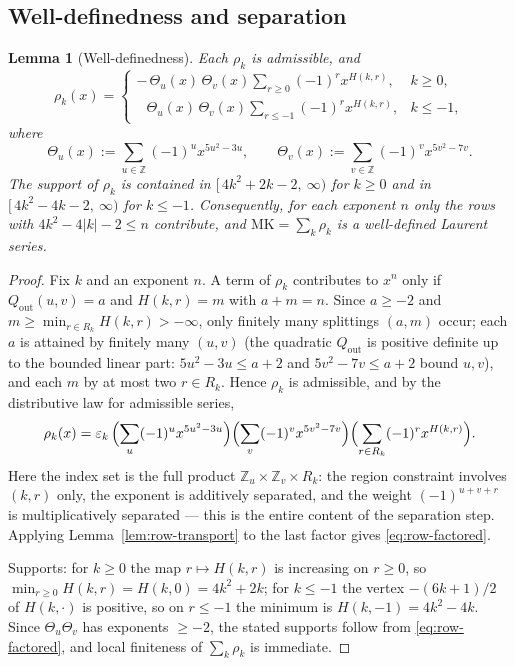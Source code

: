 \documentclass[12pt]{amsart}
\newtheorem{lemma}[theorem]{Lemma}
\theoremstyle{definition}
\theoremstyle{remark}
\newcommand{\ZZ}{\mathbb{Z}}
\newcommand{\MK}{\mathrm{MK}}
\begin{document}
\subsection{Well-definedness and separation}

\begin{lemma}[Well-definedness]\label{lem:mk-welldef}
Each $\rho_k$ is admissible, and
\begin{equation}\label{eq:row-factored}
  \rho_k(x)=
  \begin{cases}
    -\,\Theta_u(x)\,\Theta_v(x)\displaystyle\sum_{r\ge0}(-1)^r x^{H(k,r)},
    & k\ge0,\\[10pt]
    \;\;\,\Theta_u(x)\,\Theta_v(x)\displaystyle\sum_{r\le-1}(-1)^r x^{H(k,r)},
    & k\le-1,
  \end{cases}
\end{equation}
where
\[
  \Theta_u(x):=\sum_{u\in\ZZ}(-1)^u x^{5u^2-3u},
  \qquad
  \Theta_v(x):=\sum_{v\in\ZZ}(-1)^v x^{5v^2-7v}.
\]
The support of $\rho_k$ is contained in
$[\,4k^2+2k-2,\ \infty)$ for $k\ge0$ and in $[\,4k^2-4k-2,\ \infty)$
for $k\le-1$.  Consequently, for each exponent $n$ only the rows with
$4k^2-4|k|-2\le n$ contribute, and $\MK=\sum_k\rho_k$ is a
well-defined Laurent series.
\end{lemma}

\begin{proof}
Fix $k$ and an exponent $n$.  A term of $\rho_k$ contributes to $x^n$
only if $Q_{\mathrm{out}}(u,v)=a$ and $H(k,r)=m$ with $a+m=n$.  Since
$a\ge-2$ and $m\ge\min_{r\in R_k}H(k,r)>-\infty$, only finitely many
splittings $(a,m)$ occur; each $a$ is attained by finitely many
$(u,v)$ (the quadratic $Q_{\mathrm{out}}$ is positive definite up to
the bounded linear part: $5u^2-3u\le a+2$ and $5v^2-7v\le a+2$ bound
$u,v$), and each $m$ by at most two $r\in R_k$.  Hence $\rho_k$ is
admissible, and by the distributive law for admissible series,
\[
  \rho_k(x)
  =\varepsilon_k\,
   \Bigl(\sum_u(-1)^u x^{5u^2-3u}\Bigr)
   \Bigl(\sum_v(-1)^v x^{5v^2-7v}\Bigr)
   \Bigl(\sum_{r\in R_k}(-1)^r x^{H(k,r)}\Bigr).
\]
Here the index set is the full product $\ZZ_u\times\ZZ_v\times R_k$:
the region constraint involves $(k,r)$ only, the exponent is additively
separated, and the weight $(-1)^{u+v+r}$ is multiplicatively
separated — this is the entire content of the separation step.
Applying Lemma~\ref{lem:row-transport} to the last factor gives
\eqref{eq:row-factored}.

Supports: for $k\ge0$ the map $r\mapsto H(k,r)$ is increasing on
$r\ge0$, so $\min_{r\ge0}H(k,r)=H(k,0)=4k^2+2k$; for $k\le-1$ the
vertex $-(6k+1)/2$ of $H(k,\cdot)$ is positive, so on $r\le-1$ the
minimum is $H(k,-1)=4k^2-4k$.  Since $\Theta_u\Theta_v$ has exponents
$\ge-2$, the stated supports follow from \eqref{eq:row-factored}, and
local finiteness of $\sum_k\rho_k$ is immediate.
\end{proof}
\end{document}
